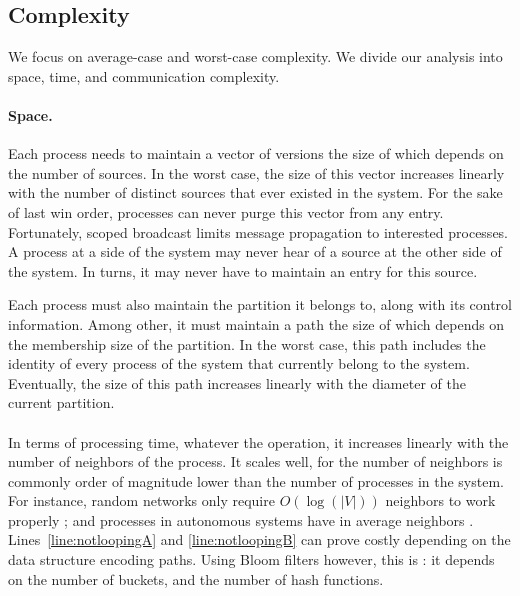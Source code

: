 



\subsection{Complexity}

We focus on average-case and worst-case complexity. We divide our
analysis into space, time, and communication complexity.

\paragraph{Space.}
Each process needs to maintain a vector of versions the size of which
depends on the number of sources. In the worst case, the size of this
vector increases linearly with the number of distinct sources that
ever existed in the system. For the sake of last win order, processes
can never purge this vector from any entry.  Fortunately, scoped broadcast limits
message propagation to interested processes. A process at a side of
the system may never hear of a source at the other side of the
system. In turns, it may never have to maintain an entry for this
source. 

\noindent Each process must also maintain the partition it belongs to,
along with its control information. Among other, it must maintain a
path the size of which depends on the membership size of the
partition. In the worst case, this path includes the identity of every
process of the system that currently belong to the system. Eventually,
the size of this path increases linearly with the diameter of the
current partition. 

\paragraph{}
In terms of processing time, whatever the operation, it increases
linearly with the number of neighbors of the process. It scales well,
for the number of neighbors is commonly order of magnitude lower than
the number of processes in the system. For instance, random networks
only require $O(\log(|V|))$ neighbors to work properly \REF; and
processes in autonomous systems have in average  neighbors
\REF. Lines~\ref{line:notloopingA} and \ref{line:notloopingB} can
prove costly depending on the data structure encoding paths. Using
Bloom filters however, this is : it depends on the
number of buckets, and the number of hash functions.

